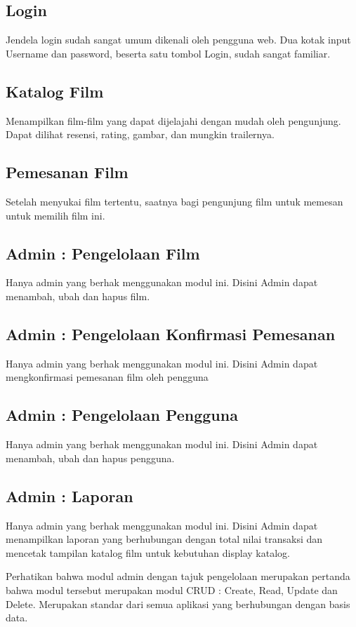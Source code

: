 \subsection{Login}
Jendela login sudah sangat umum dikenali oleh pengguna web. Dua kotak input Username dan password, beserta satu tombol Login, sudah sangat familiar. 
\subsection{Katalog Film}
Menampilkan film-film yang dapat dijelajahi dengan mudah oleh pengunjung. Dapat dilihat resensi, rating, gambar, dan mungkin trailernya.
\subsection{Pemesanan Film}
Setelah menyukai film tertentu, saatnya bagi pengunjung film untuk memesan untuk memilih film ini. 
\subsection{Admin : Pengelolaan Film}
Hanya admin yang berhak menggunakan modul ini.
Disini Admin dapat menambah, ubah dan hapus film.
\subsection{Admin : Pengelolaan Konfirmasi Pemesanan}
Hanya admin yang berhak menggunakan modul ini.
Disini Admin dapat mengkonfirmasi pemesanan film oleh pengguna
\subsection{Admin : Pengelolaan Pengguna}
Hanya admin yang berhak menggunakan modul ini.
Disini Admin dapat menambah, ubah dan hapus pengguna.
\subsection{Admin : Laporan}
Hanya admin yang berhak menggunakan modul ini.
Disini Admin dapat menampilkan laporan yang berhubungan dengan total nilai transaksi dan mencetak tampilan katalog film untuk kebutuhan display katalog.

Perhatikan bahwa modul admin dengan tajuk pengelolaan merupakan pertanda bahwa modul tersebut merupakan modul CRUD : Create, Read, Update dan Delete. Merupakan standar dari semua aplikasi yang berhubungan dengan basis data.

